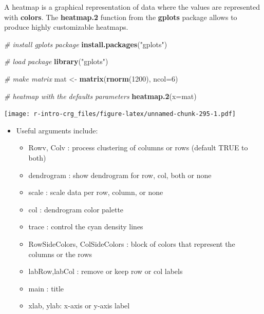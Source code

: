 \documentclass[]{book}
\newenvironment{Shaded}{\begin{snugshade}}{\end{snugshade}}
\newcommand{\CommentTok}[1]{\textcolor[rgb]{0.56,0.35,0.01}{\textit{#1}}}
\newcommand{\DataTypeTok}[1]{\textcolor[rgb]{0.13,0.29,0.53}{#1}}
\newcommand{\DecValTok}[1]{\textcolor[rgb]{0.00,0.00,0.81}{#1}}
\newcommand{\KeywordTok}[1]{\textcolor[rgb]{0.13,0.29,0.53}{\textbf{#1}}}
\newcommand{\NormalTok}[1]{#1}
\newcommand{\StringTok}[1]{\textcolor[rgb]{0.31,0.60,0.02}{#1}}
\providecommand{\tightlist}{%
  \setlength{\itemsep}{0pt}\setlength{\parskip}{0pt}}
\begin{document}
A heatmap is a graphical representation of data where the values are represented with \textbf{colors}.
The \textbf{heatmap.2} function from the \textbf{gplots} package allows to produce highly customizable heatmaps.

\begin{Shaded}
\begin{Highlighting}[]
\CommentTok{# install gplots package}
\KeywordTok{install.packages}\NormalTok{(}\StringTok{"gplots"}\NormalTok{)}
\end{Highlighting}
\end{Shaded}

\begin{Shaded}
\begin{Highlighting}[]
\CommentTok{# load package}
\KeywordTok{library}\NormalTok{(}\StringTok{"gplots"}\NormalTok{)}

\CommentTok{# make matrix}
\NormalTok{mat <-}\StringTok{ }\KeywordTok{matrix}\NormalTok{(}\KeywordTok{rnorm}\NormalTok{(}\DecValTok{1200}\NormalTok{), }\DataTypeTok{ncol=}\DecValTok{6}\NormalTok{)}

\CommentTok{# heatmap with the defaults parameters}
\KeywordTok{heatmap.2}\NormalTok{(}\DataTypeTok{x=}\NormalTok{mat)}
\end{Highlighting}
\end{Shaded}

\texttt{[image: r-intro-crg\_files/figure-latex/unnamed-chunk-295-1.pdf]}

\begin{itemize}
\tightlist
\item
  Useful arguments include:

  \begin{itemize}
  \tightlist
  \item
    Rowv, Colv : process clustering of columns or rows (default TRUE to both)
  \item
    dendrogram : show dendrogram for row, col, both or none
  \item
    scale : scale data per row, column, or none
  \item
    col : dendrogram color palette
  \item
    trace : control the cyan density lines
  \item
    RowSideColors, ColSideColors : block of colors that represent the columns or the rows
  \item
    labRow,labCol : remove or keep row or col labels
  \item
    main : title
  \item
    xlab, ylab: x-axis or y-axis label
  \end{itemize}
\end{itemize}
\end{document}
